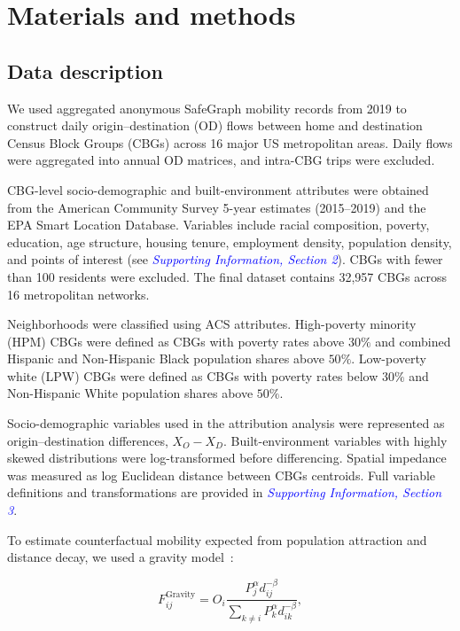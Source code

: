 \documentclass[9pt,twocolumn,twoside]{pnas-new}
\begin{document}
\section*{Materials and methods}

\subsection*{Data description}

We used aggregated anonymous SafeGraph mobility records from 2019 to construct daily origin--destination (OD) flows between home and destination Census Block Groups (CBGs) across 16 major US metropolitan areas. Daily flows were aggregated into annual OD matrices, and intra-CBG trips were excluded.

CBG-level socio-demographic and built-environment attributes were obtained from the American Community Survey 5-year estimates (2015--2019) and the EPA Smart Location Database. Variables include racial composition, poverty, education, age structure, housing tenure, employment density, population density, and points of interest (see \textit{\textcolor{blue}{Supporting Information, Section 2}}). CBGs with fewer than 100 residents were excluded. The final dataset contains 32,957 CBGs across 16 metropolitan networks.

Neighborhoods were classified using ACS attributes. High-poverty minority (HPM) CBGs were defined as CBGs with poverty rates above $30\%$ and combined Hispanic and Non-Hispanic Black population shares above $50\%$. Low-poverty white (LPW) CBGs were defined as CBGs with poverty rates below $30\%$ and Non-Hispanic White population shares above $50\%$.

Socio-demographic variables used in the attribution analysis were represented as origin--destination differences, $X_O-X_D$. Built-environment variables with highly skewed distributions were log-transformed before differencing. Spatial impedance was measured as log Euclidean distance between CBGs centroids. Full variable definitions and transformations are provided in \textit{\textcolor{blue}{Supporting Information, Section 3}}.

To estimate counterfactual mobility expected from population attraction and distance decay, we used a gravity model~\cite{zipf1946p1,anderson2011gravity}:

\begin{equation}
	F_{ij}^{\text{Gravity}} = O_i \frac{P_j^{\alpha} d_{ij}^{-\beta}}{\sum_{k \neq i} P_k^{\alpha} d_{ik}^{-\beta}},
\end{equation}
\end{document}

